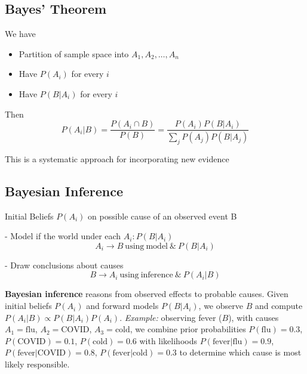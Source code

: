 \documentclass{article}
\begin{document}
\subsection*{Bayes' Theorem}
We have
\begin{itemize}
    \item Partition of sample space into \(A_1, A_2,\dots, A_n\)
    \item Have \(P(A_i)\) for every \(i\)
    \item Have \(P(B|A_i)\) for every \(i\)
\end{itemize}

Then
\[
P(A_i|B) = \frac{P(A_i \cap B)}{P(B)} = \frac{P(A_i)P(B|A_i)}{\sum_j P(A_j)P(B|A_j)}
\]

This is a systematic approach for incorporating new evidence
\\

\subsection*{Bayesian Inference}

Initial Beliefs \(P(A_i)\) on possible cause of an observed event B
 
- Model if the world under each \(A_i: P(B|A_i)\) 
\[
A_i \rightarrow B \ \text{using} \ \text{model} \ \& \ P(B|A_i)
\]

- Draw conclusions about causes
\[
B \rightarrow A_i \ \text{using} \ \text{inference} \ \& \ P(A_i|B)
\]

\textbf{Bayesian inference} reasons from observed effects to probable causes. 
Given initial beliefs $P(A_i)$ and forward models $P(B|A_i)$, we observe $B$ 
and compute $P(A_i|B) \propto P(B|A_i)P(A_i)$. \textit{Example:} observing fever ($B$), 
with causes $A_1=\text{flu}$, $A_2=\text{COVID}$, $A_3=\text{cold}$, 
we combine prior probabilities $P(\text{flu})=0.3$, $P(\text{COVID})=0.1$, 
$P(\text{cold})=0.6$ with likelihoods $P(\text{fever}|\text{flu})=0.9$, $P(\text{fever}|\text{COVID})=0.8$, 
$P(\text{fever}|\text{cold})=0.3$ to determine which cause is most likely responsible.
\end{document}
